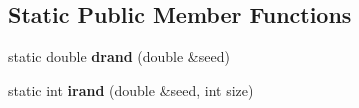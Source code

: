 \subsection*{\-Static \-Public \-Member \-Functions}
\begin{DoxyCompactItemize}
\item 
\hypertarget{classminisat_1_1Solver_ab4eba9ff2ad0f5fe5d3a91fe8df50f7d}{static double {\bfseries drand} (double \&seed)}\label{classminisat_1_1Solver_ab4eba9ff2ad0f5fe5d3a91fe8df50f7d}

\item 
\hypertarget{classminisat_1_1Solver_a4bc83f52cac0f66b3e4b2dcfbc67b0dc}{static int {\bfseries irand} (double \&seed, int size)}\label{classminisat_1_1Solver_a4bc83f52cac0f66b3e4b2dcfbc67b0dc}

\end{DoxyCompactItemize}

